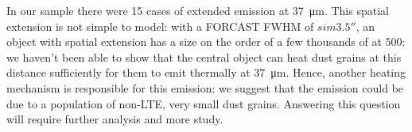 In our sample there were 15 cases of extended emission at \SI{37}{\um}. This spatial extension is not simple to model: with a FORCAST FWHM of $sim\ang{;;3.5}$, an object with spatial extension has a size on the order of a few thousands of \si{\au} at \SI{500}{\pc}: we haven't been able to show that the central object can heat dust grains at this distance sufficiently for them to emit thermally at \SI{37}{\um}. Hence, another heating mechanism is responsible for this emission: we suggest that the emission could be due to a population of non-LTE, very small dust grains. Answering this question will require further analysis and more study.
%
%
